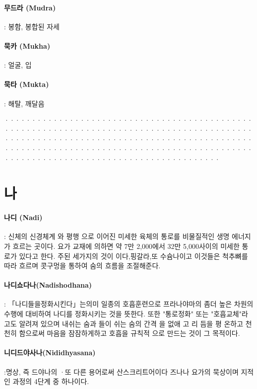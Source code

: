 \documentclass[12pt, a4paper, oneside]{book}
\let\stdsection\section
\renewcommand\section{\newpage\stdsection}
\begin{document}
\paragraph{무드라 (Mudra)} : 봉함, 봉합된 자세

\paragraph{묵카 (Mukha)} : 얼굴, 입

\paragraph{묵타 (Mukta)} : 해탈, 깨달음

································································································································································································································

\newpage
\section{나}

\paragraph{나디 (Nadi)} : 신체의 신경체계 와 평행 으로 이어진 미세한 육체의 통로를 비물질적인 생명 에너지가 흐르는 곳이다. 요가 교재에 의하면 약 7만 2,000에서 32만 5,000사이의 미세한 통로가 있다고 한다. 주된 세가지의 것이 이다,핑갈라,또 수슘나이고 이것들은 척추뼈를 따라 흐르며 콧구멍을 통하여 숨의 흐름을 조절해준다.

\paragraph{나디쇼다나(Nadishodhana)} : 「나디들을정화시킨다」는의미 일종의 호흡훈련으로 프라나야마의 좀더 높은 차원의 수행에 대비하여 나디를 정화시키는 것을 뜻한다. 또한 "통로정화" 또는 "호흡교체"라고도 알려져 있으며 내쉬는 숨과 들이 쉬는 숨의 간격 을 없애 고 리 듬을 평 온하고 천천히 함으로써 마음을 잠잠하게하고 호흡을 규칙적 으로 만드는 것이 그 목적이다.

\paragraph{니디드야사나(Nididhyasana)} :명상, 즉 드야나의 ·또 다른 용어로써 산스크리트어이다 즈나나 요가의 묵상이며 지적인 과정의 4단계 중 하나이다.
\end{document}
